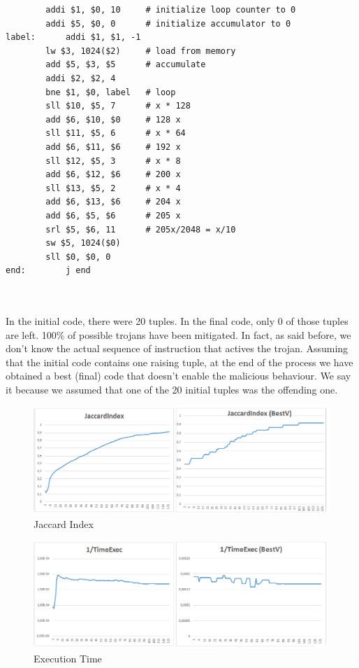 \documentclass[a4paper,twoside]{article}
\theoremstyle{definition}
\theoremstyle{remark}
\begin{document}
\begin{lstlisting}
		addi $1, $0, 10		# initialize loop counter to 0
		addi $5, $0, 0		# initialize accumulator to 0	
label:		addi $1, $1, -1
		lw $3, 1024($2)		# load from memory
		add $5, $3, $5		# accumulate
		addi $2, $2, 4	
		bne $1, $0, label	# loop
		sll $10, $5, 7		# x * 128
		add $6, $10, $0		# 128 x
		sll $11, $5, 6		# x * 64
		add $6, $11, $6		# 192 x
		sll $12, $5, 3		# x * 8
		add $6, $12, $6		# 200 x
		sll $13, $5, 2		# x * 4
		add $6, $13, $6		# 204 x
		add $6, $5, $6		# 205 x
		srl $5, $6, 11		# 205x/2048 = x/10 
		sw $5, 1024($0)		
		sll $0, $0, 0		
end: 		j end
			
			

\end{lstlisting}

In the initial code, there were 20 tuples.
In the final code, only 0 of those tuples are left.
100\% of possible trojans have been mitigated. In fact, as said before, we don't know the actual sequence of instruction that actives the trojan. Assuming that the initial code contains one raising tuple, at the end of the process we have obtained a best (final) code that doesn't enable the malicious behaviour. We say it because we assumed that one of the 20 initial tuples was the offending one.

\newpage

\begin{figure}[H]
\includegraphics[scale=0.5]{Immagini/02}
\caption{Jaccard Index}
\end{figure}

\begin{figure}[H]
\raggedright
\includegraphics[scale=0.5]{Immagini/03}
\caption{Execution Time}
\end{figure}
\end{document}
